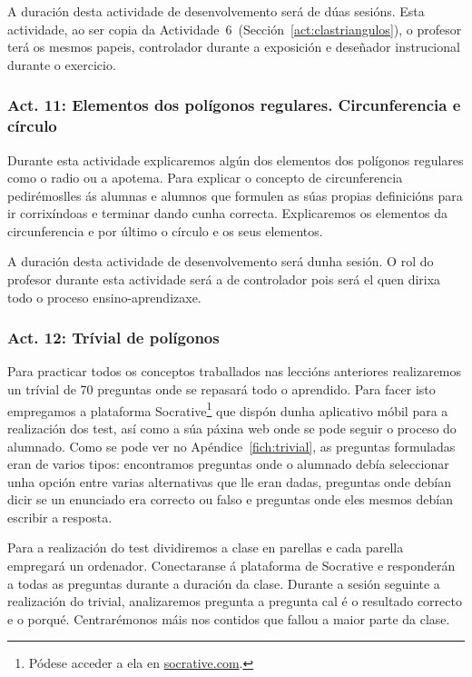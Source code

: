 A duración desta actividade de desenvolvemento será de dúas sesións. Esta actividade, ao ser copia da Actividade~6~(Sección~\ref{act:clastriangulos}), o profesor terá os mesmos papeis, controlador durante a exposición e deseñador instrucional durante o exercicio.

\subsubsection{Act. 11: Elementos dos polígonos regulares. Circunferencia e círculo}\label{act:elementos}
Durante esta actividade explicaremos algún dos elementos dos polígonos regulares como o radio ou a apotema. Para explicar o concepto de circunferencia pedirémoslles ás alumnas e alumnos que formulen as súas propias definicións para ir corrixíndoas e terminar dando cunha correcta. Explicaremos os elementos da circunferencia e por último o círculo e os seus elementos.

A duración desta actividade de desenvolvemento será dunha sesión. O rol do profesor durante esta actividade será a de controlador pois será el quen dirixa todo o proceso ensino-aprendizaxe.

\subsubsection{Act. 12: Trívial de polígonos}\label{act:trivial}
Para practicar todos os conceptos traballados nas leccións anteriores realizaremos un trívial de 70 preguntas onde se repasará todo o aprendido. Para facer isto empregamos a plataforma Socrative\footnote{Pódese acceder a ela en \href{http://www.socrative.com/}{socrative.com}.} que dispón dunha aplicativo móbil para a realización dos test, así como a súa páxina web onde se pode seguir o proceso do alumnado. Como se pode ver no Apéndice~\ref{fich:trivial}, as preguntas formuladas eran de varios tipos: encontramos preguntas onde o alumnado debía seleccionar unha opción entre varias alternativas que lle eran dadas, preguntas onde debían dicir se un enunciado era correcto ou falso e preguntas onde eles mesmos debían escribir a resposta.

Para a realización do test dividiremos a clase en parellas e cada parella empregará un ordenador. Conectaranse á plataforma de Socrative e responderán a todas as preguntas durante a duración da clase. Durante a sesión seguinte a realización do trivial, analizaremos pregunta a pregunta cal é o resultado correcto e o porqué. Centrarémonos máis nos contidos que fallou a maior parte da clase.

